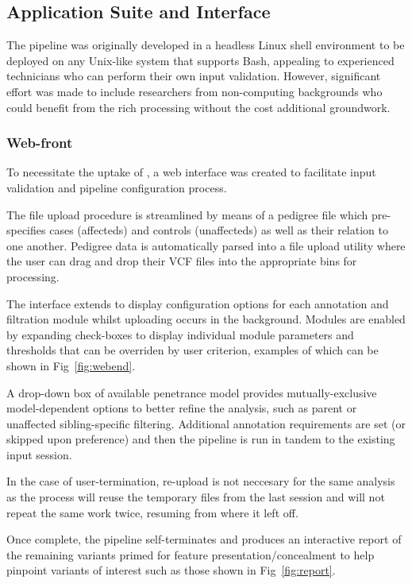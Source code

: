 
\subsection{Application Suite and Interface}

The pipeline was originally developed in a headless Linux shell environment to be deployed on any Unix-like system that supports Bash, appealing to experienced technicians who can perform their own input validation. However, significant effort was made to include researchers from non-computing backgrounds who could benefit from the rich processing without the cost additional groundwork.


\subsubsection{Web-front}

To necessitate the uptake of \app, a web interface was created to facilitate input validation and pipeline configuration process.

The file upload procedure is streamlined by means of a pedigree file which pre-specifies cases (affecteds) and controls (unaffecteds) as well as their relation to one another. Pedigree data is automatically parsed into a file upload utility where the user can drag and drop their VCF files into the appropriate bins for processing.

The interface extends to display configuration options for each annotation and filtration module whilst uploading occurs in the background. Modules are enabled by expanding check-boxes to display individual module parameters and thresholds that can be overriden by user criterion, examples of which can be shown in Fig~\ref{fig:webend}. 

A drop-down box of available penetrance model provides mutually-exclusive model-dependent options to better refine the analysis, such as parent or unaffected sibling-specific filtering. Additional annotation requirements are set (or skipped upon preference) and then the pipeline is run in tandem to the existing input session.

In the case of user-termination, re-upload is not neccesary for the same analysis as the process will reuse the temporary files from the last session and will not repeat the same work twice, resuming from where it left off.

Once complete, the pipeline self-terminates and produces an interactive report of the remaining variants primed for feature presentation/concealment to help pinpoint variants of interest such as those shown in Fig~\ref{fig:report}.

